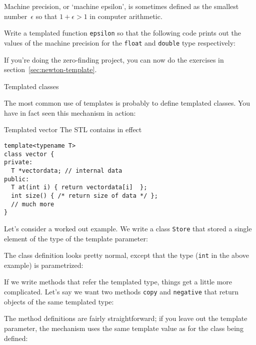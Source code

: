 \begin{exercise}
  \label{ex:eps-template}
  Machine precision, or `machine epsilon', is sometimes defined as the
  smallest number~$\epsilon$ so that $1+\epsilon>1$ in computer
  arithmetic.

  Write a templated function \lstinline{epsilon} so that the following code
  prints out the values of the machine precision for the \lstinline{float} and
  \lstinline{double} type respectively:
\end{exercise}

\begin{exercise}
  If you're doing the zero-finding project,
  you can now do the exercises in section~\ref{sec:newton-template}.
\end{exercise}

 {Templated classes}

The most common use of templates is probably to define templated
classes.
You have in fact seen this mechanism in action:

\begin{block}{Templated vector}
  \label{sl:template-vector}
  The \ac{STL} contains
  in effect
\begin{lstlisting}
template<typename T>
class vector {
private:
  T *vectordata; // internal data
public:
  T at(int i) { return vectordata[i]  };
  int size() { /* return size of data */ };
  // much more
}
\end{lstlisting}
\end{block}

Let's consider a worked out example.
We write a class \lstinline+Store+
that stored a single element of the type
of the template parameter:
%

The class definition looks pretty normal,
except that the type (\lstinline+int+ in the above example)
is parametrized:
%

If we write methods that refer the templated type,
things get a little more complicated.
Let's say we want two methods \lstinline+copy+ and \lstinline+negative+
that return objects of the same templated type:
%

The method definitions are fairly straightforward;
if you leave out the template parameter,
the 
mechanism uses the same template value 
as for the class being defined:
%

